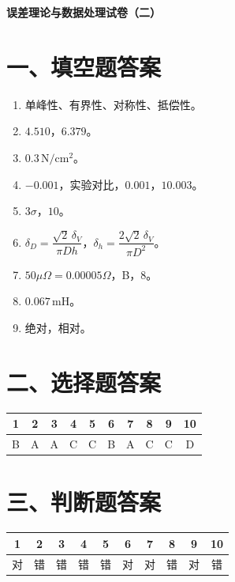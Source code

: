 \documentclass[UTF8,12pt,a4paper]{ctexart}
\begin{document}
\begin{center}
    {\bfseries 误差理论与数据处理试卷（二）}\par
    \vspace{0.8em}
\end{center}
\vspace{0.6em}

\section*{一、填空题答案}
\begin{enumerate}[label=\arabic*、]
\item 单峰性、有界性、对称性、抵偿性。
\item $4.510$，$6.379$。
\item $0.3\,\mathrm{N/cm^2}$。
\item $-0.001$，实验对比，$0.001$，$10.003$。
\item $3\sigma$，$10$。
\item $\delta_D=\dfrac{\sqrt{2}\,\delta_V}{\pi Dh}$，$\delta_h=\dfrac{2\sqrt{2}\,\delta_V}{\pi D^2}$。
\item $50\mu\Omega=0.00005\Omega$，B，$8$。
\item $0.067\,\mathrm{mH}$。
\item 绝对，相对。
\end{enumerate}

\section*{二、选择题答案}
\begin{center}
\begin{tabular}{cccccccccc}
\toprule
1&2&3&4&5&6&7&8&9&10\\
\midrule
B&A&A&C&C&B&A&C&C&D\\
\bottomrule
\end{tabular}
\end{center}

\section*{三、判断题答案}
\begin{center}
\begin{tabular}{cccccccccc}
\toprule
1&2&3&4&5&6&7&8&9&10\\
\midrule
对&错&错&错&错&对&对&错&对&错\\
\bottomrule
\end{tabular}
\end{center}
\end{document}
